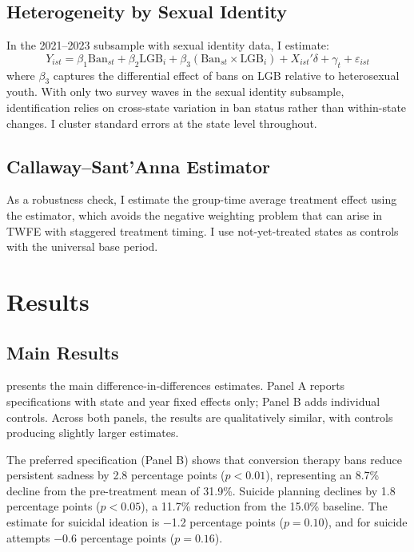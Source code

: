\documentclass[12pt]{article}
\begin{document}
\subsection{Heterogeneity by Sexual Identity}

In the 2021--2023 subsample with sexual identity data, I estimate:
\begin{equation}
Y_{ist} = \beta_1 \text{Ban}_{st} + \beta_2 \text{LGB}_i + \beta_3 (\text{Ban}_{st} \times \text{LGB}_i) + X_{ist}'\delta + \gamma_t + \varepsilon_{ist}
\label{eq:ddd}
\end{equation}
where $\beta_3$ captures the differential effect of bans on LGB relative to heterosexual youth. With only two survey waves in the sexual identity subsample, identification relies on cross-state variation in ban status rather than within-state changes. I cluster standard errors at the state level throughout.

\subsection{Callaway--Sant'Anna Estimator}

As a robustness check, I estimate the group-time average treatment effect using the \citet{callaway2021} estimator, which avoids the negative weighting problem that can arise in TWFE with staggered treatment timing. I use not-yet-treated states as controls with the universal base period.

\section{Results}

\subsection{Main Results}

 presents the main difference-in-differences estimates. Panel A reports specifications with state and year fixed effects only; Panel B adds individual controls. Across both panels, the results are qualitatively similar, with controls producing slightly larger estimates.

The preferred specification (Panel B) shows that conversion therapy bans reduce persistent sadness by 2.8 percentage points ($p < 0.01$), representing an 8.7\% decline from the pre-treatment mean of 31.9\%. Suicide planning declines by 1.8 percentage points ($p < 0.05$), a 11.7\% reduction from the 15.0\% baseline. The estimate for suicidal ideation is $-$1.2 percentage points ($p = 0.10$), and for suicide attempts $-$0.6 percentage points ($p = 0.16$).
\end{document}
